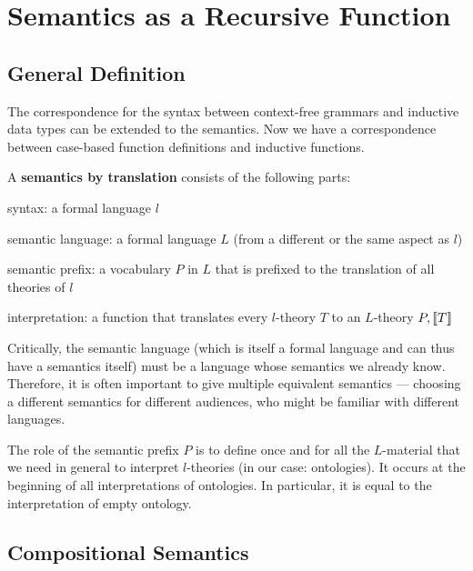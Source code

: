 \section{Semantics as a Recursive Function}

\subsection{General Definition}

The correspondence for the syntax between context-free grammars and inductive data types can be extended to the semantics.
Now we have a correspondence between case-based function definitions and inductive functions.

\begin{definition}
A \textbf{semantics by translation} consists of the following parts:
\begin{compactitem}
 \item syntax: a formal language $l$
 \item semantic language: a formal language $L$ (from a different or the same aspect as $l$)
 \item semantic prefix: a vocabulary $P$ in $L$ that is prefixed to the translation of all theories of $l$
 \item interpretation: a function that translates every $l$-theory $T$ to an $L$-theory $P,\llbracket T\rrbracket$
\end{compactitem}
\end{definition}

Critically, the semantic language (which is itself a formal language and can thus have a semantics itself) must be a language whose semantics we already know.
Therefore, it is often important to give multiple equivalent semantics --- choosing a different semantics for different audiences, who might be familiar with different languages.

The role of the semantic prefix $P$ is to define once and for all the $L$-material that we need in general to interpret $l$-theories (in our case: ontologies).
It occurs at the beginning of all interpretations of ontologies.
In particular, it is equal to the interpretation of empty ontology.

\subsection{Compositional Semantics}

